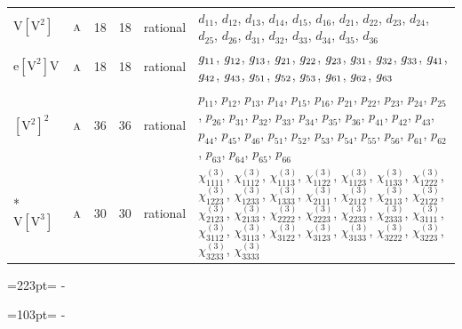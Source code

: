 \documentclass[10pt,a4paper]{article}
\newcommand{\needspace}[1]{\par\penalty-100\begingroup\dimen0=#1\relax\dimen2=\pagegoal
  \advance\dimen2-\pagetotal\ifdim\dimen0>\dimen2\relax\ifdim\dimen2>0pt\vfil\break\fi\fi
  \endgroup}
\numberwithin{equation}{section}
\newcommand{\irr}[1]{\text{\normalfont\scshape #1}}
\newcommand{\jahn}[1]{\mathrm{#1}}
\newlength{\fillwidth}\newlength{\cellwidth}\newlength{\colwidth}
\begin{document}
{\begin{longtable}{@{}llrrl>{\RaggedRight\arraybackslash}p{\fillwidth}@{}}
$\jahn{V[V^{2}]}$ & $\irr{a}$ & 18 & 18 & rational & $d_{11}$, $d_{12}$, $d_{13}$, $d_{14}$, $d_{15}$, $d_{16}$, $d_{21}$, $d_{22}$, $d_{23}$, $d_{24}$, $d_{25}$, $d_{26}$, $d_{31}$, $d_{32}$, $d_{33}$, $d_{34}$, $d_{35}$, $d_{36}$\\
$\jahn{e[V^{2}]V}$ & $\irr{a}$ & 18 & 18 & rational & $\mathnormal{g}_{11}$, $\mathnormal{g}_{12}$, $\mathnormal{g}_{13}$, $\mathnormal{g}_{21}$, $\mathnormal{g}_{22}$, $\mathnormal{g}_{23}$, $\mathnormal{g}_{31}$, $\mathnormal{g}_{32}$, $\mathnormal{g}_{33}$, $\mathnormal{g}_{41}$, $\mathnormal{g}_{42}$, $\mathnormal{g}_{43}$, $\mathnormal{g}_{51}$, $\mathnormal{g}_{52}$, $\mathnormal{g}_{53}$, $\mathnormal{g}_{61}$, $\mathnormal{g}_{62}$, $\mathnormal{g}_{63}$\\
$\jahn{[V^{2}]^{2}}$ & $\irr{a}$ & 36 & 36 & rational & $p_{11}$, $p_{12}$, $p_{13}$, $p_{14}$, $p_{15}$, $p_{16}$, $p_{21}$, $p_{22}$, $p_{23}$, $p_{24}$, $p_{25}$, $p_{26}$, $p_{31}$, $p_{32}$, $p_{33}$, $p_{34}$, $p_{35}$, $p_{36}$, $p_{41}$, $p_{42}$, $p_{43}$, $p_{44}$, $p_{45}$, $p_{46}$, $p_{51}$, $p_{52}$, $p_{53}$, $p_{54}$, $p_{55}$, $p_{56}$, $p_{61}$, $p_{62}$, $p_{63}$, $p_{64}$, $p_{65}$, $p_{66}$\\*
$\jahn{V[V^{3}]}$ & $\irr{a}$ & 30 & 30 & rational & $\chi^{(3)}_{1111}$, $\chi^{(3)}_{1112}$, $\chi^{(3)}_{1113}$, $\chi^{(3)}_{1122}$, $\chi^{(3)}_{1123}$, $\chi^{(3)}_{1133}$, $\chi^{(3)}_{1222}$, $\chi^{(3)}_{1223}$, $\chi^{(3)}_{1233}$, $\chi^{(3)}_{1333}$, $\chi^{(3)}_{2111}$, $\chi^{(3)}_{2112}$, $\chi^{(3)}_{2113}$, $\chi^{(3)}_{2122}$, $\chi^{(3)}_{2123}$, $\chi^{(3)}_{2133}$, $\chi^{(3)}_{2222}$, $\chi^{(3)}_{2223}$, $\chi^{(3)}_{2233}$, $\chi^{(3)}_{2333}$, $\chi^{(3)}_{3111}$, $\chi^{(3)}_{3112}$, $\chi^{(3)}_{3113}$, $\chi^{(3)}_{3122}$, $\chi^{(3)}_{3123}$, $\chi^{(3)}_{3133}$, $\chi^{(3)}_{3222}$, $\chi^{(3)}_{3223}$, $\chi^{(3)}_{3233}$, $\chi^{(3)}_{3333}$\\
\bottomrule\end{longtable}}
\needspace{223pt}
\needspace{103pt}
\end{document}
